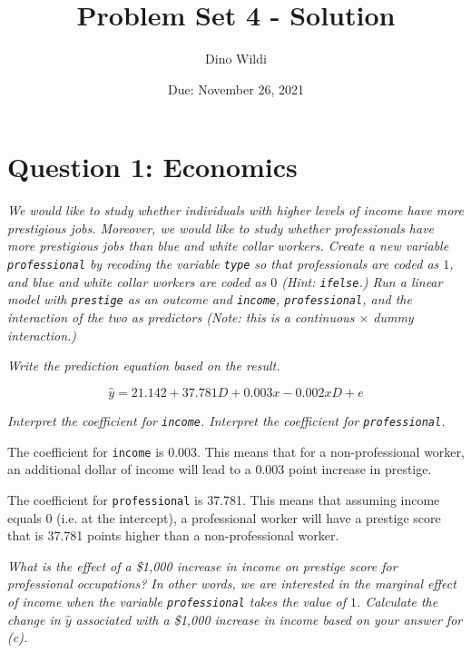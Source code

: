 \documentclass[12pt,a4paper]{article}
\title{Problem Set 4 - Solution}
\date{Due: November 26, 2021}
\author{Dino Wildi}
\begin{document}
	
	\maketitle
	
\section*{Question 1: Economics}

\textit{\noindent We would like to study whether individuals with higher levels of income have more prestigious jobs. Moreover, we would like to study whether professionals have more prestigious jobs than blue and white collar workers.
Create a new variable \texttt{professional} by recoding the variable \texttt{type} so that professionals are coded as $1$, and blue and white collar workers are coded as $0$ (Hint: \texttt{ifelse}.)
Run a linear model with \texttt{prestige} as an outcome and \texttt{income}, \texttt{professional}, and the interaction of the two as predictors (Note: this is a continuous $\times$ dummy interaction.)}
\vspace{.25cm}



\vspace{.5cm}
\textit{\noindent Write the prediction equation based on the result.}
\vspace{.25cm}

\[\hat{y} = 21.142 + 37.781D + 0.003x - 0.002xD + e\]

\vspace{.5cm}
\textit{\noindent Interpret the coefficient for \texttt{income}. Interpret the coefficient for \texttt{professional}.}
\vspace{.25cm}

\noindent The coefficient for \texttt{income} is 0.003. This means that for a non-professional worker, an additional dollar of income will lead to a 0.003 point increase in prestige.

\noindent The coefficient for \texttt{professional} is 37.781. This means that assuming income equals 0 (i.e. at the intercept), a professional worker will have a prestige score that is 37.781 points higher than a non-professional worker.

\vspace{.5cm}
\textit{\noindent What is the effect of a \$1,000 increase in income on prestige score for professional occupations? In other words, we are interested in the marginal effect of income when the variable \texttt{professional} takes the value of $1$. Calculate the change in $\hat{y}$ associated with a \$1,000 increase in income based on your answer for (c).}
\vspace{.25cm}
\end{document}
